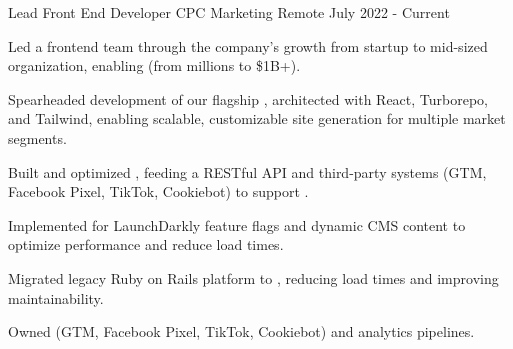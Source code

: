 \begin{cventries}


\cventry
{Lead Front End Developer} %
{CPC Marketing} %
{Remote} %
{July 2022 - Current} %
{
  \begin{cvitems} %
    \item {Led a frontend team through the company's growth from startup to mid-sized organization, enabling  (from millions to \$1B+).}
    \item {Spearheaded development of our flagship , architected with React, Turborepo, and Tailwind, enabling scalable, customizable site generation for multiple market segments.}
    \item {Built and optimized , feeding a RESTful API and third-party systems (GTM, Facebook Pixel, TikTok, Cookiebot) to support .}
    \item {Implemented  for LaunchDarkly feature flags and dynamic CMS content to optimize performance and reduce load times.}
    \item {Migrated legacy Ruby on Rails platform to , reducing load times and improving maintainability.}
    \item {Owned  (GTM, Facebook Pixel, TikTok, Cookiebot) and analytics pipelines}.
  \end{cvitems}
}


\end{cventries}
